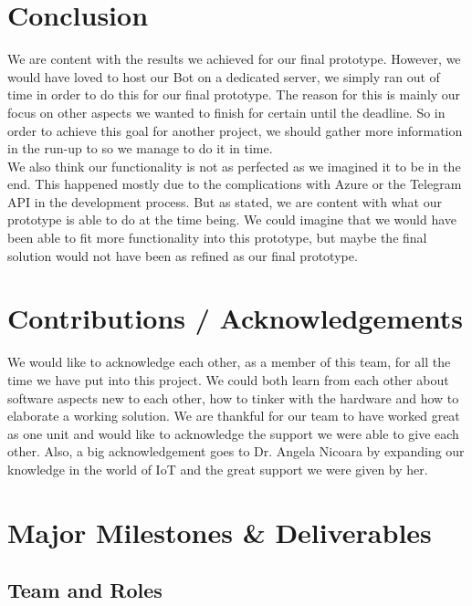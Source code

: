 \documentclass[a4paper]{article}
\begin{document}
	\section{Conclusion}
	
	We are content with the results we achieved for our final prototype.
	However, we would have loved to host our Bot on a dedicated server, we simply ran out of time in order to do this for our final prototype.
	The reason for this is mainly our focus on other aspects we wanted to finish for certain until the deadline.
	So in order to achieve this goal for another project, we should gather more information in the run-up to so we manage to do it in time. \\
	\noindent
	We also think our functionality is not as perfected as we imagined it to be in the end. 
	This happened mostly due to the complications with Azure or the Telegram API in the development process.
	But as stated, we are content with what our prototype is able to do at the time being.
	We could imagine that we would have been able to fit more functionality into this prototype, but maybe the final solution would not have been as refined as our final prototype.
			
	\section{Contributions / Acknowledgements}
	
	We would like to acknowledge each other, as a member of this team, for all the time we have put into this project.
	We could both learn from each other about software aspects new to each other, how to tinker with the hardware and how to elaborate a working solution.
	We are thankful for our team to have worked great as one unit and would like to acknowledge the support we were able to give each other.
	Also, a big acknowledgement goes to Dr. Angela Nicoara by expanding our knowledge in the world of IoT and the great support we were given by her.
	
	\newpage
	
	\section{Major Milestones \& Deliverables}
	
		\subsection{Team and Roles}
		
\end{document}
